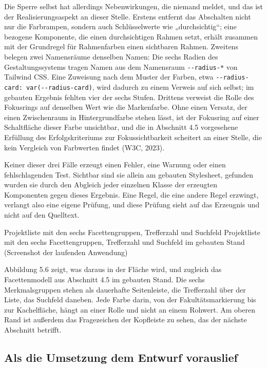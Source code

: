 Die Sperre selbst hat allerdings Nebenwirkungen, die niemand meldet, und das ist der Realisierungsaspekt an dieser Stelle. Erstens entfernt das Abschalten nicht nur die Farbrampen, sondern auch Schlüsselwerte wie „durchsichtig“; eine bezogene Komponente, die einen durchsichtigen Rahmen setzt, erhält zusammen mit der Grundregel für Rahmenfarben einen sichtbaren Rahmen. Zweitens belegen zwei Namensräume denselben Namen: Die sechs Radien des Gestaltungssystems tragen Namen aus dem Namensraum \texttt{-{}-radius-*} von Tailwind CSS. Eine Zuweisung nach dem Muster der Farben, etwa \texttt{-{}-radius-card: var(-{}-radius-card)}, wird dadurch zu einem Verweis auf sich selbst; im gebauten Ergebnis fehlten vier der sechs Stufen. Drittens verweist die Rolle des Fokusrings auf denselben Wert wie die Markenfarbe. Ohne einen Versatz, der einen Zwischenraum in Hintergrundfarbe stehen lässt, ist der Fokusring auf einer Schaltfläche dieser Farbe unsichtbar, und die in Abschnitt 4.5 vorgesehene Erfüllung des Erfolgskriteriums zur Fokussichtbarkeit scheitert an einer Stelle, die kein Vergleich von Farbwerten findet (W3C, 2023).

Keiner dieser drei Fälle erzeugt einen Fehler, eine Warnung oder einen fehlschlagenden Test. Sichtbar sind sie allein am gebauten Stylesheet, gefunden wurden sie durch den Abgleich jeder einzelnen Klasse der erzeugten Komponenten gegen dieses Ergebnis. Eine Regel, die eine andere Regel erzwingt, verlangt also eine eigene Prüfung, und diese Prüfung sieht auf das Erzeugnis und nicht auf den Quelltext.

%
{Projektliste mit den sechs Facettengruppen, Trefferzahl und Suchfeld}%
{Projektliste mit den sechs Facettengruppen, Trefferzahl und Suchfeld im gebauten Stand (Screenshot der laufenden Anwendung)}

Abbildung 5.6 zeigt, was daraus in der Fläche wird, und zugleich das Facettenmodell aus Abschnitt 4.5 im gebauten Stand. Die sechs Merkmalsgruppen stehen als dauerhafte Seitenleiste, die Trefferzahl über der Liste, das Suchfeld daneben. Jede Farbe darin, von der Fakultätsmarkierung bis zur Kachelfläche, hängt an einer Rolle und nicht an einem Rohwert. Am oberen Rand ist außerdem das Fragezeichen der Kopfleiste zu sehen, das der nächste Abschnitt betrifft.

\subsection{Als die Umsetzung dem Entwurf vorauslief}

